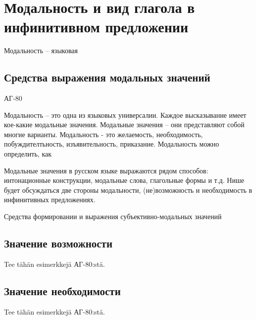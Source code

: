 \section{Модальность и вид глагола в инфинитивном предложении}

Модальность -- языковая 

\subsection{Средства выражения модальных значений}



АГ-80 

Модальность -- это одна из языковых универсалии. Каждое высказывание имеет кое-какие модальные значения. Модальные значения -- они представляют собой многие варианты. Модальность - это желаемость, необходимость, побуждителтьность, изъявительность, приказание. Модальность можно определить, как 

Модальные значения в русском языке выражаются рядом способов: интонационные конструкции, модальные слова, глагольные формы и т.д. Нише будет обсуждаться две стороны модальности, (не)возможность и необходимость в инфинитивных предложениях.

Средства формировании и выражения субъективно-модальных значений


\subsection{Значение возможности}

Tee tähän esimerkkejä АГ-80:stä.

\subsection{Значение необходимости}

Tee tähän esimerkkejä АГ-80:stä.
